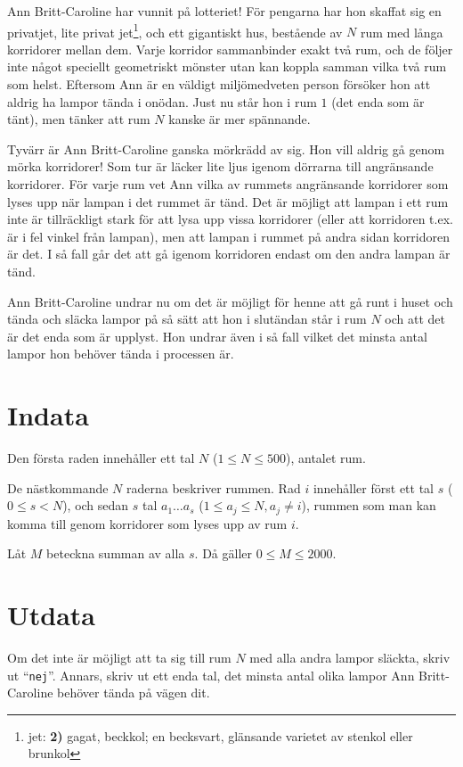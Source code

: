 \def\version{jury-3}
\noindent
Ann Britt-Caroline har vunnit på lotteriet!
För pengarna har hon skaffat sig en privatjet, lite privat jet\footnote{jet: \textbf{2)} gagat, beckkol; en becksvart, glänsande varietet av stenkol eller brunkol}, och ett gigantiskt hus, bestående av $N$ rum med långa korridorer mellan dem.
Varje korridor sammanbinder exakt två rum, och de följer inte något speciellt geometriskt mönster utan kan koppla samman vilka två rum som helst.
Eftersom Ann är en väldigt miljömedveten person försöker hon att aldrig ha lampor tända i onödan.
Just nu står hon i rum $1$ (det enda som är tänt), men tänker att rum $N$ kanske är mer spännande.

Tyvärr är Ann Britt-Caroline ganska mörkrädd av sig. Hon vill aldrig gå genom mörka korridorer!
Som tur är läcker lite ljus igenom dörrarna till angränsande korridorer.
För varje rum vet Ann vilka av rummets angränsande korridorer som lyses upp när lampan i det rummet är tänd.
Det är möjligt att lampan i ett rum inte är tillräckligt stark för att lysa upp vissa korridorer (eller att korridoren t.ex. är i fel vinkel från lampan), men
att lampan i rummet på andra sidan korridoren är det.
I så fall går det att gå igenom korridoren endast om den andra lampan är tänd.

Ann Britt-Caroline undrar nu om det är möjligt för henne att gå runt i huset och tända och släcka lampor på så sätt att hon i slutändan står i rum $N$ och att det är det enda som är upplyst.
Hon undrar även i så fall vilket det minsta antal lampor hon behöver tända i processen är.

\section*{Indata}
Den första raden innehåller ett tal $N$ ($1 \le N \le 500$), antalet rum.

De nästkommande $N$ raderna beskriver rummen.
Rad $i$ innehåller först ett tal $s$ ($0 \le s < N$), och sedan $s$ tal $a_1 \dots a_s$ ($1 \le a_j \le N, a_j \neq i$), rummen som man kan komma till genom korridorer som lyses upp av rum $i$.

Låt $M$ beteckna summan av alla $s$. Då gäller $0 \le M \le 2000$.

\section*{Utdata}
Om det inte är möjligt att ta sig till rum $N$ med alla andra lampor släckta, skriv ut ``\texttt{nej}''.
Annars, skriv ut ett enda tal, det minsta antal olika lampor Ann Britt-Caroline behöver tända på vägen dit.

